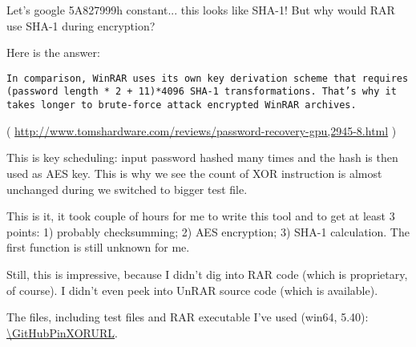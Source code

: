Let's google 5A827999h constant... this looks like SHA-1! But why would RAR use SHA-1 during encryption?

Here is the answer:

\begin{lstlisting}
In comparison, WinRAR uses its own key derivation scheme that requires (password length * 2 + 11)*4096 SHA-1 transformations. That’s why it takes longer to brute-force attack encrypted WinRAR archives.
\end{lstlisting}
( \url{http://www.tomshardware.com/reviews/password-recovery-gpu,2945-8.html} )

This is key scheduling: input password hashed many times and the hash is then used as \ac{AES} key.
This is why we see the count of XOR instruction is almost unchanged during we switched to bigger test file.

This is it, it took couple of hours for me to write this tool and to get at least 3 points: 1) probably checksumming; 2) \ac{AES} encryption; 3) SHA-1 calculation.
The first function is still unknown for me.

Still, this is impressive, because I didn't dig into RAR code (which is proprietary, of course). I didn't even peek into UnRAR source code (which is available).

The files, including test files and RAR executable I've used (win64, 5.40): \\
\url{\GitHubPinXORURL}.

